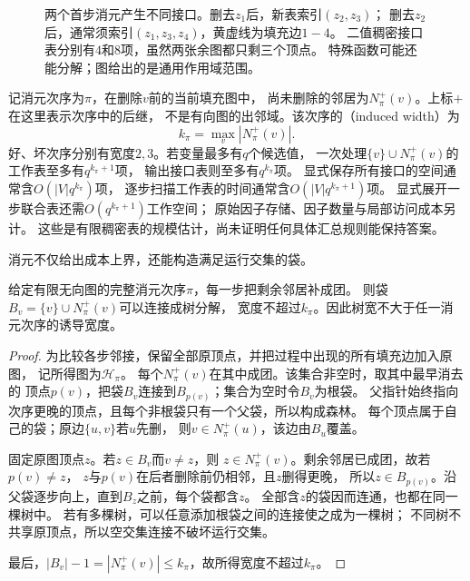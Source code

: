 \begin{figure}[htbp]
  \centering
  
  \caption{两个首步消元产生不同接口。删去\(z_1\)后，新表索引\((z_2,z_3)\)；
  删去\(z_2\)后，通常须索引\((z_1,z_3,z_4)\)，黄虚线为填充边\(1-4\)。
  二值稠密接口表分别有\(4\)和\(8\)项，虽然两张余图都只剩三个顶点。
  特殊函数可能还能分解；图给出的是通用作用域范围。}
  \label{fig:graph-theory-elimination-fill}
\end{figure}

记消元次序为\(\pi\)，在删除\(v\)前的当前填充图中，
尚未删除的邻居为\(N^+_\pi(v)\)。上标\(+\)在这里表示次序中的后继，
不是有向图的出邻域。该次序的（induced width）为
\[
  k_\pi=\max_v|N^+_\pi(v)|.
\]
好、坏次序分别有宽度\(2,3\)。若变量最多有\(q\)个候选值，
一次处理\(\{v\}\cup N^+_\pi(v)\)的工作表至多有\(q^{k_\pi+1}\)项，
输出接口表则至多有\(q^{k_\pi}\)项。
显式保存所有接口的空间通常含\(O(|V|q^{k_\pi})\)项，
逐步扫描工作表的时间通常含\(O(|V|q^{k_\pi+1})\)项。
显式展开一步联合表还需\(O(q^{k_\pi+1})\)工作空间；
原始因子存储、因子数量与局部访问成本另计。
这些是有限稠密表的规模估计，尚未证明任何具体汇总规则能保持答案。

消元不仅给出成本上界，还能构造满足运行交集的袋。

\begin{theorem}[消元序产生树分解]
  \label{thm:graph-theory-elimination-tree-decomposition}
  给定有限无向图的完整消元次序\(\pi\)，每一步把剩余邻居补成团。
  则袋\(B_v=\{v\}\cup N^+_\pi(v)\)可以连接成树分解，
  宽度不超过\(k_\pi\)。因此树宽不大于任一消元次序的诱导宽度。
\end{theorem}

\begin{proof}
为比较各步邻接，保留全部原顶点，并把过程中出现的所有填充边加入原图，
记所得图为\(\mathcal H_\pi\)。
每个\(N^+_\pi(v)\)在其中成团。该集合非空时，取其中最早消去的
顶点\(p(v)\)，把袋\(B_v\)连接到\(B_{p(v)}\)；集合为空时令\(B_v\)为根袋。
父指针始终指向次序更晚的顶点，且每个非根袋只有一个父袋，所以构成森林。
每个顶点属于自己的袋；原边\(\{u,v\}\)若\(u\)先删，
则\(v\in N^+_\pi(u)\)，该边由\(B_u\)覆盖。

固定原图顶点\(z\)。若\(z\in B_v\)而\(v\neq z\)，则
\(z\in N^+_\pi(v)\)。剩余邻居已成团，故若\(p(v)\neq z\)，
\(z\)与\(p(v)\)在后者删除前仍相邻，且\(z\)删得更晚，
所以\(z\in B_{p(v)}\)。沿父袋逐步向上，直到\(B_z\)之前，每个袋都含\(z\)。
全部含\(z\)的袋因而连通，也都在同一棵树中。
若有多棵树，可以任意添加根袋之间的连接使之成为一棵树；
不同树不共享原顶点，所以空交集连接不破坏运行交集。

最后，\(|B_v|-1=|N^+_\pi(v)|\leq k_\pi\)，故所得宽度不超过\(k_\pi\)。
\end{proof}


